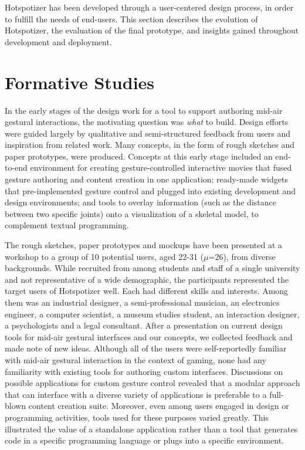 Hotspotizer has been developed through a user-centered design process, in order to fulfill the needs of end-users. This section describes the evolution of Hotspotizer, the evaluation of the final prototype, and insights gained throughout development and deployment.

\section{Formative Studies}
\label{sec:formative-studies}

In the early stages of the design work for a tool to support authoring mid-air gestural interactions, the motivating question was \emph{what} to build. Design efforts were guided largely by qualitative and semi-structured feedback from users and inspiration from related work. Many concepts, in the form of rough sketches and paper prototypes, were produced. Concepts at this early stage included an end-to-end environment for creating gesture-controlled interactive movies that fused gesture authoring and content creation in one application; ready-made widgets that pre-implemented gesture control and plugged into existing development and design environments; and tools to overlay information (such as the distance between two specific joints) onto a visualization of a skeletal model, to complement textual programming.

The rough sketches, paper prototypes and mockups have been presented at a workshop to a group of 10 potential users, aged 22-31 ($\mu$=26), from diverse backgrounds. While recruited from among students and staff of a single university and not representative of a wide demographic, the participants represented the target users of Hotspotizer well. Each had different skills and interests. Among them was an industrial designer, a semi-professional musician, an electronics engineer, a computer scientist, a museum studies student, an interaction designer, a psychologists and a legal consultant. After a presentation on current design tools for mid-air gestural interfaces and our concepts, we collected feedback and made note of new ideas. Although all of the users were self-reportedly familiar with mid-air gestural interaction in the context of gaming, none had any familiarity with existing tools for authoring custom interfaces. Discussions on possible applications for custom gesture control revealed that a modular approach that can interface with a diverse variety of applications is preferable to a full-blown content creation suite. Moreover, even among users engaged in design or programming activities, tools used for these purposes varied greatly. This illustrated the value of a standalone application rather than a tool that generates code in a specific programming language or plugs into a specific environment.

